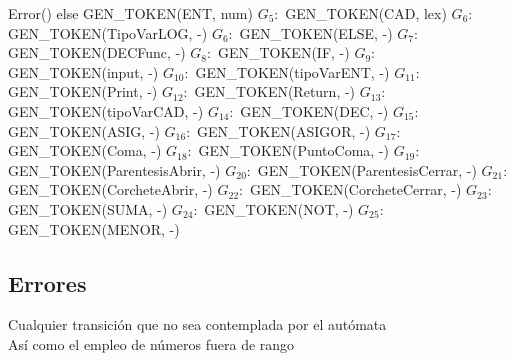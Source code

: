 \documentclass{article}
\begin{document}
\newline
\textnormal{\hspace{10mm} Error()}
\newline
\textnormal{\hspace{8mm}else GEN\_TOKEN(ENT, num)} 
\medskip \newline
\textnormal{$G_5:$ GEN\_TOKEN(CAD, lex)}
\medskip \newline
\textnormal{$G_6:$ GEN\_TOKEN(TipoVarLOG, -)}
\medskip \newline
\textnormal{$G_6:$ GEN\_TOKEN(ELSE, -)}
\medskip \newline
\textnormal{$G_7:$ GEN\_TOKEN(DECFunc, -)}
\medskip \newline
\textnormal{$G_8:$ GEN\_TOKEN(IF, -)}
\medskip \newline
\textnormal{$G_9:$ GEN\_TOKEN(input, -)}
\medskip \newline
\textnormal{$G_{10}:$ GEN\_TOKEN(tipoVarENT, -)}
\medskip \newline
\textnormal{$G_{11}:$ GEN\_TOKEN(Print, -)}
\medskip \newline
\textnormal{$G_{12}:$ GEN\_TOKEN(Return, -)}
\medskip \newline
\textnormal{$G_{13}:$ GEN\_TOKEN(tipoVarCAD, -)}
\medskip \newline
\textnormal{$G_{14}:$ GEN\_TOKEN(DEC, -)}
\medskip \newline
\textnormal{$G_{15}:$ GEN\_TOKEN(ASIG, -)}
\medskip \newline
\textnormal{$G_{16}:$ GEN\_TOKEN(ASIGOR, -)}
\medskip \newline
\textnormal{$G_{17}:$ GEN\_TOKEN(Coma, -)}
\medskip \newline
\textnormal{$G_{18}:$ GEN\_TOKEN(PuntoComa, -)}
\medskip \newline
\textnormal{$G_{19}:$ GEN\_TOKEN(ParentesisAbrir, -)}
\medskip \newline
\textnormal{$G_{20}:$ GEN\_TOKEN(ParentesisCerrar, -)}
\medskip \newline
\textnormal{$G_{21}:$ GEN\_TOKEN(CorcheteAbrir, -)}
\medskip \newline
\textnormal{$G_{22}:$ GEN\_TOKEN(CorcheteCerrar, -)}
\medskip \newline
\textnormal{$G_{23}:$ GEN\_TOKEN(SUMA, -)}
\medskip \newline
\textnormal{$G_{24}:$ GEN\_TOKEN(NOT, -)}
\medskip \newline
\textnormal{$G_{25}:$ GEN\_TOKEN(MENOR, -)}
\newpage
\subsection*{Errores}
\textnormal{Cualquier transición que no sea contemplada por el autómata \\
Así como el empleo de números fuera de rango}
\newpage
\end{document}

